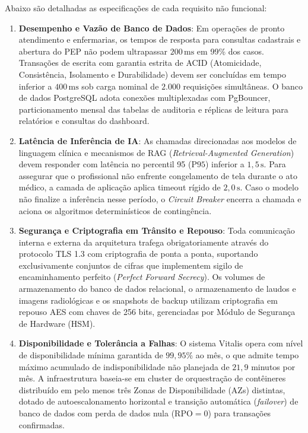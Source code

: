 Abaixo são detalhadas as especificações de cada requisito não funcional:

\begin{enumerate}[label=\textbf{RNF-\arabic*:}, leftmargin=*]
    \item \textbf{Desempenho e Vazão de Banco de Dados}:
    Em operações de pronto atendimento e enfermarias, os tempos de resposta para consultas cadastrais e abertura do PEP não podem ultrapassar $200\,\text{ms}$ em 99\% dos casos. Transações de escrita com garantia estrita de ACID (Atomicidade, Consistência, Isolamento e Durabilidade) devem ser concluídas em tempo inferior a $400\,\text{ms}$ sob carga nominal de $2.000$ requisições simultâneas. O banco de dados PostgreSQL adota conexões multiplexadas com PgBouncer, particionamento mensal das tabelas de auditoria e réplicas de leitura para relatórios e consultas do dashboard.

    \item \textbf{Latência de Inferência de IA}:
    As chamadas direcionadas aos modelos de linguagem clínica e mecanismos de RAG (\textit{Retrieval-Augmented Generation}) \cite{lewis_rag:2020} devem responder com latência no percentil 95 ($\text{P95}$) inferior a $1{,}5\,\text{s}$. Para assegurar que o profissional não enfrente congelamento de tela durante o ato médico, a camada de aplicação aplica timeout rígido de $2{,}0\,\text{s}$. Caso o modelo não finalize a inferência nesse período, o \textit{Circuit Breaker} encerra a chamada e aciona os algoritmos determinísticos de contingência.

    \item \textbf{Segurança e Criptografia em Trânsito e Repouso}:
    Toda comunicação interna e externa da arquitetura trafega obrigatoriamente através do protocolo TLS 1.3 com criptografia de ponta a ponta, suportando exclusivamente conjuntos de cifras que implementem sigilo de encaminhamento perfeito (\textit{Perfect Forward Secrecy}). Os volumes de armazenamento do banco de dados relacional, o armazenamento de laudos e imagens radiológicas e os snapshots de backup utilizam criptografia em repouso AES com chaves de 256 bits, gerenciadas por Módulo de Segurança de Hardware (HSM).

    \item \textbf{Disponibilidade e Tolerância a Falhas}:
    O sistema Vitalis opera com nível de disponibilidade mínima garantida de $99{,}95\%$ ao mês, o que admite tempo máximo acumulado de indisponibilidade não planejada de $21{,}9$ minutos por mês. A infraestrutura baseia-se em cluster de orquestração de contêineres distribuído em pelo menos três Zonas de Disponibilidade (AZs) distintas, dotado de autoescalonamento horizontal e transição automática (\textit{failover}) de banco de dados com perda de dados nula ($\text{RPO} = 0$) para transações confirmadas.


\end{enumerate}
